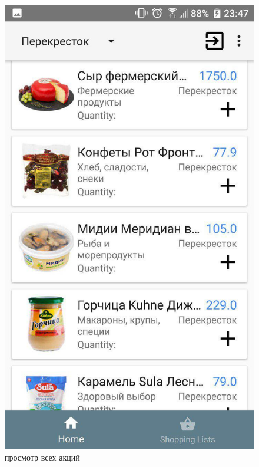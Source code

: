\begin{figure}[h!]
    \centering
    \includegraphics[height=0.38\textheight]{./screenshots/3/home.jpg}
    \caption{\small{просмотр всех акций}}
    \label{items}
    \endminipage\hfill

\end{figure}
